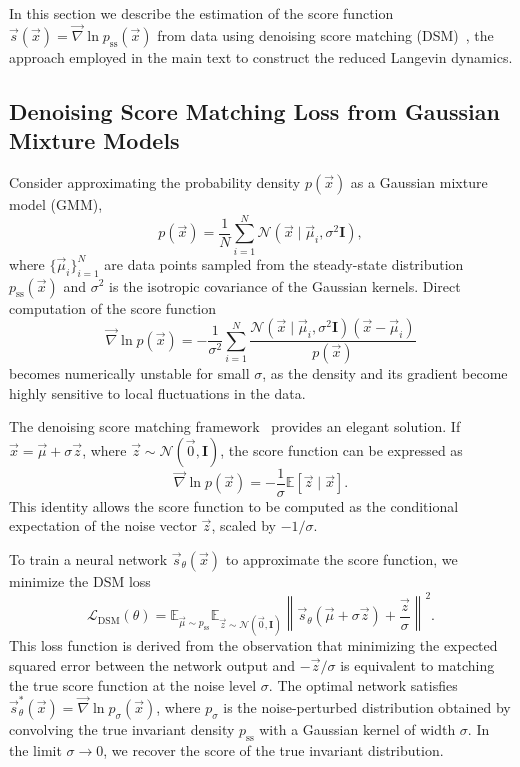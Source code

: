 \documentclass[%
  prl,
  reprint,
  amsmath,
  amssymb,
  aps
]{revtex4-2}
\newcommand{\vvec}[1]{\vec{#1}}
\begin{document}
In this section we describe the estimation of the score function $\vvec{s}(\vvec{x})=\vvec{\nabla} \ln p_{\mathrm{ss}}(\vvec{x})$ from data using denoising score matching (DSM)~\cite{Vincent2011,SongSohlDicksteinKingma2021}, the approach employed in the main text to construct the reduced Langevin dynamics.

\subsection{Denoising Score Matching Loss from Gaussian Mixture Models}

Consider approximating the probability density $p(\vvec{x})$ as a Gaussian mixture model (GMM),
\begin{equation}
p(\vvec{x}) = \frac{1}{N} \sum_{i=1}^{N} \mathcal{N}(\vvec{x} \mid \vvec{\mu}_i, \sigma^2 \bm{I}),
\end{equation}
where $\{\vvec{\mu}_i\}_{i=1}^N$ are data points sampled from the steady-state distribution $p_{\mathrm{ss}}(\vvec{x})$ and $\sigma^2$ is the isotropic covariance of the Gaussian kernels. Direct computation of the score function
\begin{equation}
\vvec{\nabla} \ln p(\vvec{x}) = -\frac{1}{\sigma^2} \sum_{i=1}^{N} \frac{\mathcal{N}(\vvec{x} \mid \vvec{\mu}_i, \sigma^2 \bm{I})(\vvec{x} - \vvec{\mu}_i)}{p(\vvec{x})}
\end{equation}
becomes numerically unstable for small $\sigma$, as the density and its gradient become highly sensitive to local fluctuations in the data.

The denoising score matching framework~\cite{Vincent2011,SongSohlDicksteinKingma2021} provides an elegant solution. If $\vvec{x} = \vvec{\mu} + \sigma \vvec{z}$, where $\vvec{z} \sim \mathcal{N}(\vvec{0}, \bm{I})$, the score function can be expressed as
\begin{equation}
\label{eq:dsm_identity}
\vvec{\nabla} \ln p(\vvec{x}) = -\frac{1}{\sigma} \mathbb{E}[\vvec{z} \mid \vvec{x}].
\end{equation}
This identity allows the score function to be computed as the conditional expectation of the noise vector $\vvec{z}$, scaled by $-1/\sigma$.

To train a neural network $\vvec{s}_\theta(\vvec{x})$ to approximate the score function, we minimize the DSM loss
\begin{equation}
\label{eq:dsm_loss}
\mathcal{L}_{\text{DSM}}(\theta) = \mathbb{E}_{\vvec{\mu} \sim p_{\mathrm{ss}}} \mathbb{E}_{\vvec{z} \sim \mathcal{N}(\vvec{0}, \bm{I})} \left\| \vvec{s}_\theta(\vvec{\mu} + \sigma \vvec{z}) + \frac{\vvec{z}}{\sigma} \right\|^2.
\end{equation}
This loss function is derived from the observation that minimizing the expected squared error between the network output and $-\vvec{z}/\sigma$ is equivalent to matching the true score function at the noise level $\sigma$. The optimal network satisfies $\vvec{s}_\theta^*(\vvec{x}) = \vvec{\nabla} \ln p_\sigma(\vvec{x})$, where $p_\sigma$ is the noise-perturbed distribution obtained by convolving the true invariant density $p_{\mathrm{ss}}$ with a Gaussian kernel of width $\sigma$. In the limit $\sigma \to 0$, we recover the score of the true invariant distribution.
\end{document}
